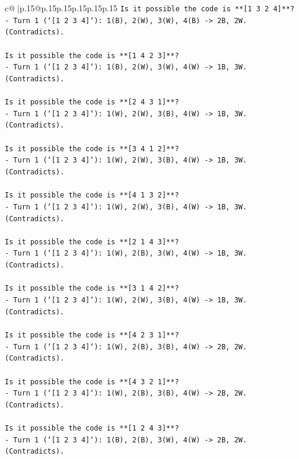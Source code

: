 \documentclass{article}
\begin{document}
{\begin{supertabular}{c@{$\;$}|p{.15\linewidth}@{}p{.15\linewidth}p{.15\linewidth}p{.15\linewidth}p{.15\linewidth}p{.15\linewidth}}
{{{\texttt{Is it possible the code is **{[}1 3 2 4{]}**?} \\
\texttt{{-} Turn 1 (`{[}1 2 3 4{]}`): 1(B), 2(W), 3(W), 4(B) {-}> 2B, 2W. (Contradicts).} \\
\\ 
\texttt{Is it possible the code is **{[}1 4 2 3{]}**?} \\
\texttt{{-} Turn 1 (`{[}1 2 3 4{]}`): 1(B), 2(W), 3(W), 4(W) {-}> 1B, 3W. (Contradicts).} \\
\\ 
\texttt{Is it possible the code is **{[}2 4 3 1{]}**?} \\
\texttt{{-} Turn 1 (`{[}1 2 3 4{]}`): 1(W), 2(W), 3(B), 4(W) {-}> 1B, 3W. (Contradicts).} \\
\\ 
\texttt{Is it possible the code is **{[}3 4 1 2{]}**?} \\
\texttt{{-} Turn 1 (`{[}1 2 3 4{]}`): 1(W), 2(W), 3(B), 4(W) {-}> 1B, 3W. (Contradicts).} \\
\\ 
\texttt{Is it possible the code is **{[}4 1 3 2{]}**?} \\
\texttt{{-} Turn 1 (`{[}1 2 3 4{]}`): 1(W), 2(W), 3(B), 4(W) {-}> 1B, 3W. (Contradicts).} \\
\\ 
\texttt{Is it possible the code is **{[}2 1 4 3{]}**?} \\
\texttt{{-} Turn 1 (`{[}1 2 3 4{]}`): 1(W), 2(B), 3(W), 4(W) {-}> 1B, 3W. (Contradicts).} \\
\\ 
\texttt{Is it possible the code is **{[}3 1 4 2{]}**?} \\
\texttt{{-} Turn 1 (`{[}1 2 3 4{]}`): 1(W), 2(W), 3(B), 4(W) {-}> 1B, 3W. (Contradicts).} \\
\\ 
\texttt{Is it possible the code is **{[}4 2 3 1{]}**?} \\
\texttt{{-} Turn 1 (`{[}1 2 3 4{]}`): 1(W), 2(B), 3(B), 4(W) {-}> 2B, 2W. (Contradicts).} \\
\\ 
\texttt{Is it possible the code is **{[}4 3 2 1{]}**?} \\
\texttt{{-} Turn 1 (`{[}1 2 3 4{]}`): 1(W), 2(B), 3(B), 4(W) {-}> 2B, 2W. (Contradicts).} \\
\\ 
\texttt{Is it possible the code is **{[}1 2 4 3{]}**?} \\
\texttt{{-} Turn 1 (`{[}1 2 3 4{]}`): 1(B), 2(B), 3(W), 4(W) {-}> 2B, 2W. (Contradicts).} \\
}}}
\end{supertabular}}
\end{document}
